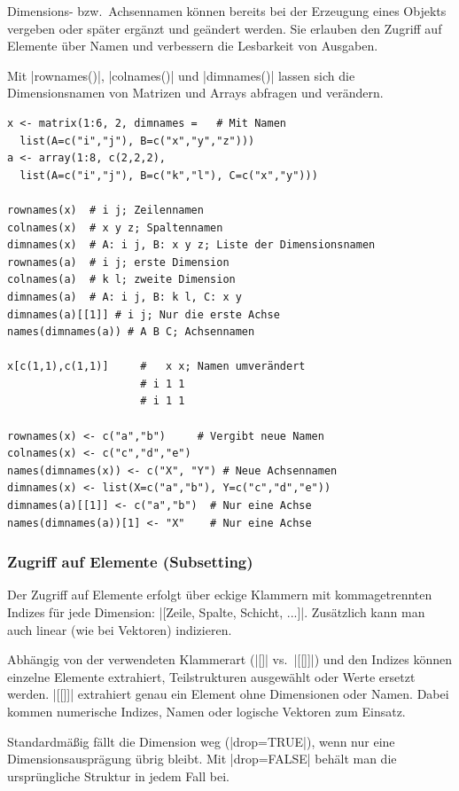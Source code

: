 \documentclass[10pt,twocolumn]{scrartcl}
\renewcommand{\lstinline}{\mycoloredinline}
\begin{document}
Dimensions- bzw.\ Achsennamen können bereits bei der Erzeugung eines Objekts vergeben oder später ergänzt und geändert werden. Sie erlauben den Zugriff auf Elemente über Namen und verbessern die Lesbarkeit von Ausgaben.

Mit \lstinline|rownames()|, \lstinline|colnames()| und \lstinline|dimnames()| lassen sich die Dimensionsnamen von Matrizen und Arrays abfragen und verändern.

\begin{lstlisting}
x <- matrix(1:6, 2, dimnames =   # Mit Namen
  list(A=c("i","j"), B=c("x","y","z")))
a <- array(1:8, c(2,2,2),
  list(A=c("i","j"), B=c("k","l"), C=c("x","y")))
  
rownames(x)  # i j; Zeilennamen
colnames(x)  # x y z; Spaltennamen
dimnames(x)  # A: i j, B: x y z; Liste der Dimensionsnamen
rownames(a)  # i j; erste Dimension
colnames(a)  # k l; zweite Dimension
dimnames(a)  # A: i j, B: k l, C: x y
dimnames(a)[[1]] # i j; Nur die erste Achse
names(dimnames(a)) # A B C; Achsennamen

x[c(1,1),c(1,1)]     #   x x; Namen umverändert
                     # i 1 1
                     # i 1 1

rownames(x) <- c("a","b")     # Vergibt neue Namen
colnames(x) <- c("c","d","e")
names(dimnames(x)) <- c("X", "Y") # Neue Achsennamen
dimnames(x) <- list(X=c("a","b"), Y=c("c","d","e"))
dimnames(a)[[1]] <- c("a","b")  # Nur eine Achse
names(dimnames(a))[1] <- "X"    # Nur eine Achse
\end{lstlisting}


\subsubsection{Zugriff auf Elemente (Subsetting)}

Der Zugriff auf Elemente erfolgt über eckige Klammern mit kommagetrennten Indizes für jede Dimension: \lstinline|[Zeile, Spalte, Schicht, ...]|. Zusätzlich kann man auch linear (wie bei Vektoren) indizieren.

Abhängig von der verwendeten Klammerart (\lstinline|[]| vs.\ \lstinline|[[]]|) und den Indizes können einzelne Elemente extrahiert, Teilstrukturen ausgewählt oder Werte ersetzt werden. \lstinline|[[]]| extrahiert genau ein Element ohne Dimensionen oder Namen. Dabei kommen numerische Indizes, Namen oder logische Vektoren zum Einsatz.

Standardmäßig fällt die Dimension weg (\lstinline|drop=TRUE|), wenn nur eine Dimensionsausprägung übrig bleibt. Mit \lstinline|drop=FALSE| behält man die ursprüngliche Struktur in jedem Fall bei.
\end{document}
